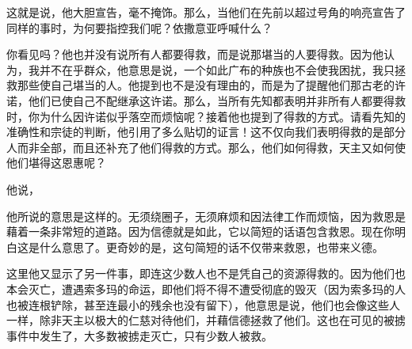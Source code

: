这就是说，他大胆宣告，毫不掩饰。那么，当他们在先前以超过号角的响亮宣告了同样的事时，为何要指控我们呢？依撒意亚呼喊什么？\par

你看见吗？他也并没有说所有人都要得救，而是说那堪当的人要得救。因为他认为，我并不在乎群众，他意思是说，一个如此广布的种族也不会使我困扰，我只拯救那些使自己堪当的人。他提到也不是没有理由的，而是为了提醒他们那古老的许诺，他们已使自己不配继承这许诺。那么，当所有先知都表明并非所有人都要得救时，你为什么因许诺似乎落空而烦恼呢？接着他也提到了得救的方式。请看先知的准确性和宗徒的判断，他引用了多么贴切的证言！这不仅向我们表明得救的是部分人而非全部，而且还补充了他们得救的方式。那么，他们如何得救，天主又如何使他们堪得这恩惠呢？\par

他说，\par

他所说的意思是这样的。无须绕圈子，无须麻烦和因法律工作而烦恼，因为救恩是藉着一条非常短的道路。因为信德就是如此，它以简短的话语包含救恩。现在你明白这是什么意思了。更奇妙的是，这句简短的话不仅带来救恩，也带来义德。\par

\par

这里他又显示了另一件事，即连这少数人也不是凭自己的资源得救的。因为他们也本会灭亡，遭遇索多玛的命运，即他们将不得不遭受彻底的毁灭（因为索多玛的人也被连根铲除，甚至连最小的残余也没有留下），他意思是说，他们也会像这些人一样，除非天主以极大的仁慈对待他们，并藉信德拯救了他们。这也在可见的被掳事件中发生了，大多数被掳走灭亡，只有少数人被救。\par

\par


